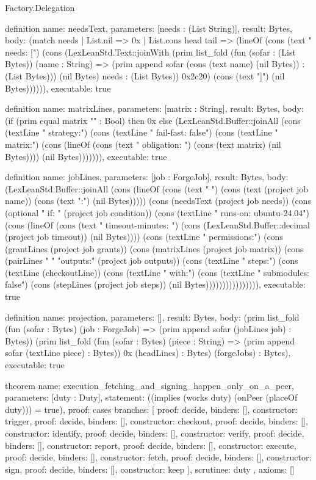 \begin{lexlean}{Factory.Delegation}
\begin{semanticmodule}
definition{
  name: needsText,
  parameters: [needs : (List String)],
  result: Bytes,
  body: (match needs
      | List.nil => 0x
      | List.cons head tail => (lineOf (cons (text "    needs: [") (cons (LexLeanStd.Text::joinWith (prim list_fold (fun (sofar : (List Bytes)) (name : String) => (prim append sofar (cons (text name) (nil Bytes)) : (List Bytes))) (nil Bytes) needs : (List Bytes)) 0x2c20) (cons (text "]") (nil Bytes)))))),
  executable: true
}

definition{
  name: matrixLines,
  parameters: [matrix : String],
  result: Bytes,
  body: (if (prim equal matrix "" : Bool) then 0x else (LexLeanStd.Buffer::joinAll (cons (textLine "    strategy:") (cons (textLine "      fail-fast: false") (cons (textLine "      matrix:") (cons (lineOf (cons (text "        obligation: ") (cons (text matrix) (nil Bytes)))) (nil Bytes))))))),
  executable: true
}

definition{
  name: jobLines,
  parameters: [job : ForgeJob],
  result: Bytes,
  body: (LexLeanStd.Buffer::joinAll (cons (lineOf (cons (text "  ") (cons (text (project job name)) (cons (text ":") (nil Bytes))))) (cons (needsText (project job needs)) (cons (optional "    if: " (project job condition)) (cons (textLine "    runs-on: ubuntu-24.04") (cons (lineOf (cons (text "    timeout-minutes: ") (cons (LexLeanStd.Buffer::decimal (project job timeout)) (nil Bytes)))) (cons (textLine "    permissions:") (cons (grantLines (project job grants)) (cons (matrixLines (project job matrix)) (cons (pairLines "    " "outputs:" (project job outputs)) (cons (textLine "    steps:") (cons (textLine (checkoutLine)) (cons (textLine "        with:") (cons (textLine "          submodules: false") (cons (stepLines (project job steps)) (nil Bytes)))))))))))))))),
  executable: true
}

definition{
  name: projection,
  parameters: [],
  result: Bytes,
  body: (prim list_fold (fun (sofar : Bytes) (job : ForgeJob) => (prim append sofar (jobLines job) : Bytes)) (prim list_fold (fun (sofar : Bytes) (piece : String) => (prim append sofar (textLine piece) : Bytes)) 0x (headLines) : Bytes) (forgeJobs) : Bytes),
  executable: true
}

theorem{
  name: execution_fetching_and_signing_happen_only_on_a_peer,
  parameters: [duty : Duty],
  statement: ((implies (works duty) (onPeer (placeOf duty))) = true),
  proof: cases{
    branches: [
      {proof: decide{}, binders: [], constructor: trigger},
      {proof: decide{}, binders: [], constructor: checkout},
      {proof: decide{}, binders: [], constructor: identify},
      {proof: decide{}, binders: [], constructor: verify},
      {proof: decide{}, binders: [], constructor: report},
      {proof: decide{}, binders: [], constructor: execute},
      {proof: decide{}, binders: [], constructor: fetch},
      {proof: decide{}, binders: [], constructor: sign},
      {proof: decide{}, binders: [], constructor: keep}
    ],
    scrutinee: duty
  },
  axioms: []
}


\end{semanticmodule}
\end{lexlean}
